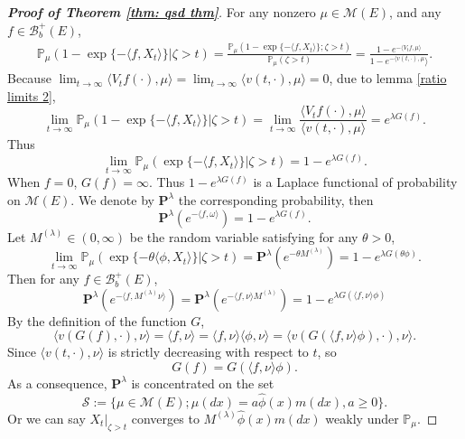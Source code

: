 \documentclass[12pt,a4paper]{amsart}
\theoremstyle{plain}
\theoremstyle{definition}
\numberwithin{equation}{section}
\begin{document}
\begin{proof}[{\bf Proof of Theorem \ref{thm: qsd thm}}]
For any nonzero $\mu\in \mathcal M(E)$, and any $f\in\mathcal B_b^+(E)$,
\begin{eqnarray*}
\mathbb P_\mu\left(\left.1-\exp\{-\langle f, X_t\rangle \}\right|\zeta>t\right)= \frac{\mathbb P_\mu\left(1-\exp\{-\langle f, X_t\rangle \};\zeta>t\right)}{\mathbb P_\mu(\zeta>t)}=\frac{1-e^{-\langle V_tf,\mu\rangle }}{1-e^{-\langle v(t,\cdot),\mu}\rangle }.
\end{eqnarray*}
Because $\lim_{t\rightarrow\infty}\langle V_tf(\cdot),\mu\rangle =\lim_{t\rightarrow\infty}\langle v(t,\cdot),\mu\rangle =0$, due to lemma \ref{ratio limits 2},
\[
\lim_{t\rightarrow\infty}\mathbb P_\mu\left(\left.1-\exp\{-\langle f, X_t\rangle \}\right|\zeta>t\right)=\lim_{t\rightarrow\infty}\frac{\langle V_tf(\cdot),\mu\rangle }{\langle v(t,\cdot),\mu\rangle }=e^{\lambda G(f)}.
\]
Thus
\[
\lim_{t\rightarrow\infty}\mathbb P_\mu\left(\left.\exp\{-\langle f, X_t\rangle \}\right|\zeta>t\right)=1-e^{\lambda G(f)}.
\]
When $f=0$, $G(f)=\infty$. Thus $1-e^{\lambda G(f)}$ is a Laplace functional of probability on $\mathcal M(E)$. We denote by $\mathbf P^{\lambda}$ the corresponding probability, then
\[
\mathbf P^{\lambda}(e^{-\langle f,\omega\rangle })=1-e^{\lambda G(f)}.
\]
Let $M^{(\lambda)}\in (0,\infty)$ be the random variable satisfying for any $\theta>0$,
\[
\lim_{t\rightarrow\infty}\mathbb P_\mu\left(\left.\exp\{-\theta\langle \phi, X_t\rangle \}\right|\zeta>t\right)
=\mathbf P^{\lambda}(e^{-\theta M^{(\lambda)}})=1-e^{\lambda G(\theta\phi)}.
\]
Then for any $f\in \mathcal B_b^+(E)$,
\[
\mathbf P^{\lambda}(e^{-\langle f,M^{(\lambda)}\nu\rangle })
=\mathbf P^{\lambda}(e^{-\langle f,\nu\rangle M^{(\lambda)}})
=1-e^{\lambda G(\langle f,\nu\rangle \phi)}
\]
By the definition of the function $G$,
\[
\langle v(G(f),\cdot),\nu\rangle =\langle f,\nu\rangle =\langle f,\nu\rangle \langle \phi,\nu\rangle =\langle v(G(\langle f,\nu\rangle \phi),\cdot),\nu\rangle .
\]
Since $\langle v(t,\cdot),\nu\rangle $ is strictly decreasing with respect to $t$, so
\begin{equation}\label{iden:G}
G(f)=G(\langle f,\nu\rangle \phi).
\end{equation}
As a consequence, $\mathbf P^\lambda$ is concentrated on the set
$$
\mathcal S:=\{\mu\in\mathcal M(E); \mu(dx)=a\hat\phi(x)m(dx), a\geq 0\}.
$$
 Or we can say  $X_t|_{\zeta>t}$ converges to  $M^{(\lambda)}\hat\phi(x)m(dx)$ weakly under $\mathbb P_\mu$.



\end{proof}
\end{document}

